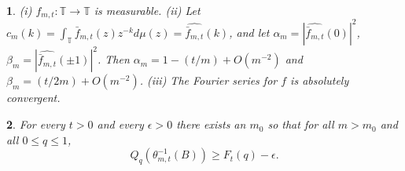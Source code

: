 \documentclass[10pt,a4paper]{amsart}
\newtheorem{lem}{}
\begin{document}
\begin{lem}
\label{lem:propertiesOffmt}(i) $f_{m,t}:\mathbb{T}\to\mathbb{T}$
is measurable. (ii) Let $\ensuremath{c_{m}(k)=\int_{\mathbb{T}}\bar{f}_{m,t}(z)z^{-k}d\mu(z)=\widehat{\bar{f}_{m,t}}(k)}$,
and let $\alpha_{m}=\left|\widehat{\bar{f}_{m,t}}(0)\right|^{2}$,
$\beta_{m}=\left|\widehat{\bar{f}_{m,t}}(\pm1)\right|^{2}$. Then
$\alpha_{m}=1-(t/m)+O(m^{-2})$ and $\beta_{m}=(t/2m)+O(m^{-2})$.
(iii) The Fourier series for $f$ is absolutely convergent. 
\end{lem}

\begin{lem}
\label{lem:F_tlowerEqThetaOfB}For every $t>0$ and every $\epsilon>0$
there exists an $m_{0}$ so that for all $m>m_{0}$ and all $0\leq q\leq1$,
\[
Q_{q}(\theta_{m,t}^{-1}(B))\geq F_{t}(q)-\epsilon.
\]
\end{lem}
\end{document}
